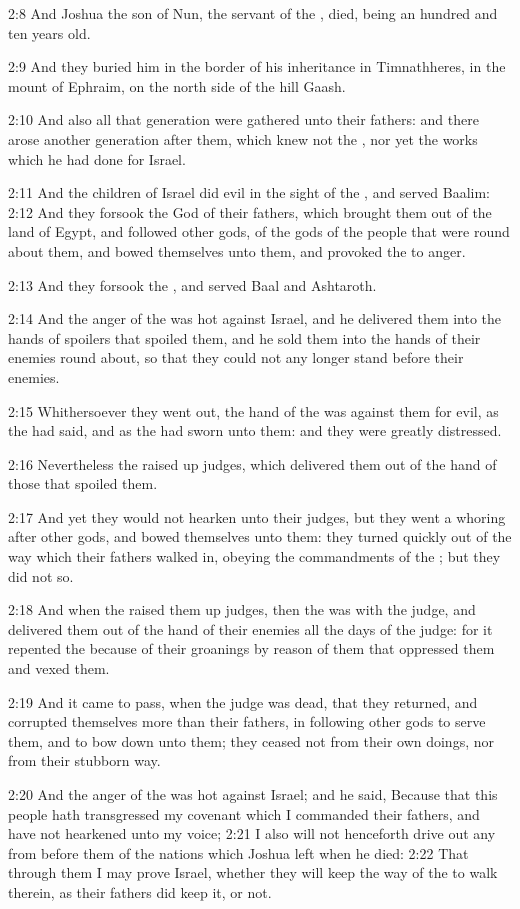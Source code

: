 2:8 And Joshua the son of Nun, the servant of the \LORD, died, being an
hundred and ten years old.

2:9 And they buried him in the border of his inheritance in
Timnathheres, in the mount of Ephraim, on the north side of the hill
Gaash.

2:10 And also all that generation were gathered unto their fathers:
and there arose another generation after them, which knew not the
\LORD, nor yet the works which he had done for Israel.

2:11 And the children of Israel did evil in the sight of the \LORD, and
served Baalim: 2:12 And they forsook the \LORD God of their fathers,
which brought them out of the land of Egypt, and followed other gods,
of the gods of the people that were round about them, and bowed
themselves unto them, and provoked the \LORD to anger.

2:13 And they forsook the \LORD, and served Baal and Ashtaroth.

2:14 And the anger of the \LORD was hot against Israel, and he
delivered them into the hands of spoilers that spoiled them, and he
sold them into the hands of their enemies round about, so that they
could not any longer stand before their enemies.

2:15 Whithersoever they went out, the hand of the \LORD was against
them for evil, as the \LORD had said, and as the \LORD had sworn unto
them: and they were greatly distressed.

2:16 Nevertheless the \LORD raised up judges, which delivered them out
of the hand of those that spoiled them.

2:17 And yet they would not hearken unto their judges, but they went a
whoring after other gods, and bowed themselves unto them: they turned
quickly out of the way which their fathers walked in, obeying the
commandments of the \LORD; but they did not so.

2:18 And when the \LORD raised them up judges, then the \LORD was with
the judge, and delivered them out of the hand of their enemies all the
days of the judge: for it repented the \LORD because of their groanings
by reason of them that oppressed them and vexed them.

2:19 And it came to pass, when the judge was dead, that they returned,
and corrupted themselves more than their fathers, in following other
gods to serve them, and to bow down unto them; they ceased not from
their own doings, nor from their stubborn way.

2:20 And the anger of the \LORD was hot against Israel; and he said,
Because that this people hath transgressed my covenant which I
commanded their fathers, and have not hearkened unto my voice; 2:21 I
also will not henceforth drive out any from before them of the nations
which Joshua left when he died: 2:22 That through them I may prove
Israel, whether they will keep the way of the \LORD to walk therein, as
their fathers did keep it, or not.

